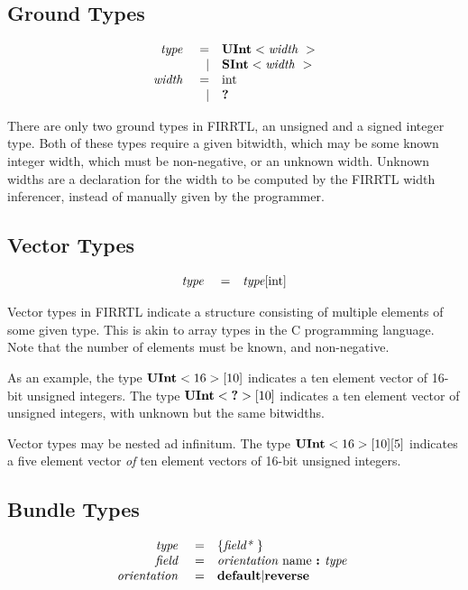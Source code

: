 \documentclass[12pt]{article}
\begin{document}
\subsection{Ground Types}
\[
\begin{array}{rrl}
\text{\em type\ }       &=     &\text{\bf UInt}<\text{\em width\ }>      \\
                &\vert &\text{\bf SInt}<\text{\em width\ }>      \\
\text{\em width\ }      &=     &\text{int}                       \\
                &\vert &\text{\bf ?\ }                      \\
\end{array}
\]

There are only two ground types in FIRRTL, an unsigned and a signed integer type.
Both of these types require a given bitwidth, which may be some known integer width, which must be non-negative, or an unknown width.
Unknown widths are a declaration for the width to be computed by the FIRRTL width inferencer, instead of manually given by the programmer.

\subsection{Vector Types}
\[
\begin{array}{rrl}
\text{\em type\ }       &=     &\text{\em type}[\text{int}]           \\
\end{array}
\]

Vector types in FIRRTL indicate a structure consisting of multiple elements of some given type.
This is akin to array types in the C programming language.
Note that the number of elements must be known, and non-negative.

As an example, the type $\text{\bf UInt}<16>[10]$ indicates a ten element vector of 16-bit unsigned integers.
The type $\text{\bf UInt}<\text{\bf ?}>[10]$ indicates a ten element vector of unsigned integers, with unknown but the same bitwidths.

Vector types may be nested ad infinitum.
The type $\text{\bf UInt}<16>[10][5]$ indicates a five element vector {\em of} ten element vectors of 16-bit unsigned integers.

\subsection{Bundle Types}
\[
\begin{array}{rrl}
\text{\em type\ }       &=     &\{\text{\em field*\ }\}                         \\
\text{\em field\ }      &=     &\text{\em orientation\ } \text{name } \text{\bf :\ } \text{\em type\ }        \\
\text{\em orientation\ }&=     &\text{\bf default} \vert \text{\bf reverse}    \\ 
\end{array}
\]
\end{document}
